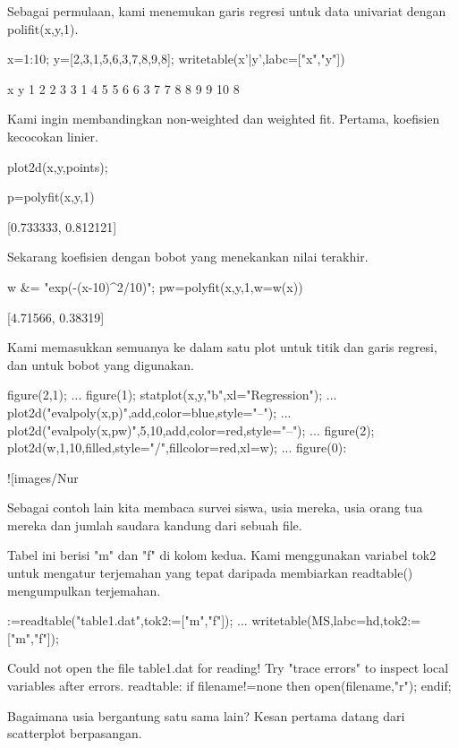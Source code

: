 \documentclass{article}
\begin{document}
Sebagai permulaan, kami menemukan garis regresi untuk data univariat
dengan polifit(x,y,1).


\>x=1:10; y=[2,3,1,5,6,3,7,8,9,8]; writetable(x'|y',labc=["x","y"])


             x         y
             1         2
             2         3
             3         1
             4         5
             5         6
             6         3
             7         7
             8         8
             9         9
            10         8

Kami ingin membandingkan non-weighted dan weighted fit. Pertama,
koefisien kecocokan linier.


\>plot2d(x,y,\>points);

\>p=polyfit(x,y,1)


    [0.733333,  0.812121]

Sekarang koefisien dengan bobot yang menekankan nilai terakhir.


\>w &= "exp(-(x-10)^2/10)"; pw=polyfit(x,y,1,w=w(x))


    [4.71566,  0.38319]

Kami memasukkan semuanya ke dalam satu plot untuk titik dan garis
regresi, dan untuk bobot yang digunakan.


\>figure(2,1);  ...  
\>   figure(1); statplot(x,y,"b",xl="Regression"); ...  
\>     plot2d("evalpoly(x,p)",\>add,color=blue,style="--"); ...  
\>     plot2d("evalpoly(x,pw)",5,10,\>add,color=red,style="--"); ...  
\>   figure(2); plot2d(w,1,10,\>filled,style="/",fillcolor=red,xl=w); ...  
\>   figure(0):


![images/Nur%

Sebagai contoh lain kita membaca survei siswa, usia mereka, usia orang
tua mereka dan jumlah saudara kandung dari sebuah file.


Tabel ini berisi "m" dan "f" di kolom kedua. Kami menggunakan variabel
tok2 untuk mengatur terjemahan yang tepat daripada membiarkan
readtable() mengumpulkan terjemahan.


:=readtable("table1.dat",tok2:=["m","f"]);  ...  
\>   writetable(MS,labc=hd,tok2:=["m","f"]);


    Could not open the file
    table1.dat
    for reading!
    Try "trace errors" to inspect local variables after errors.
    readtable:
        if filename!=none then open(filename,"r"); endif;

Bagaimana usia bergantung satu sama lain? Kesan pertama datang dari
scatterplot berpasangan.
\end{document}
